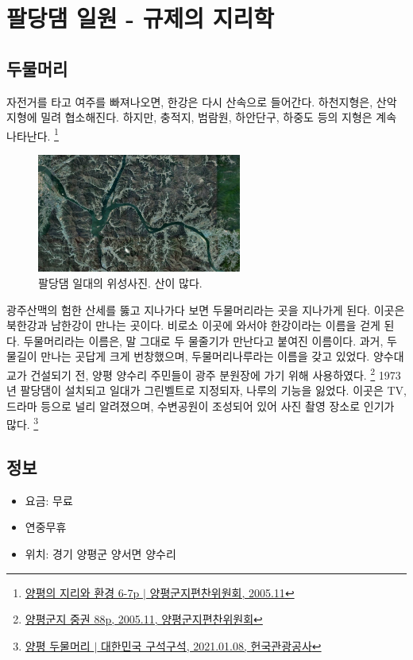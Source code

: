\section{팔당댐 일원 - 규제의 지리학}
\subsection{두물머리}
자전거를 타고 여주를 빠져나오면, 한강은 다시 산속으로 들어간다. 
하천지형은, 산악지형에 밀려 협소해진다. 하지만, 충적지, 범람원, 하안단구, 하중도 등의 지형은 계속 나타난다.
\footnote{\href{https://memory.library.kr/items/show/28910}{양평의 지리와 환경 6-7p $|$ 양평군지편찬위원회, 2005.11}}


\begin{figure}[ht]
    \centering
    \includegraphics[width=0.6\textwidth]{img/팔당호지도.jpg}
    \caption{팔당댐 일대의 위성사진. 산이 많다.\protect\footnotemark}
    \label{fig:my_label8}
\end{figure}


광주산맥의 험한 산세를 뚫고 지나가다 보면 두물머리라는 곳을 지나가게 된다. 이곳은 북한강과 남한강이 만나는 곳이다.
비로소 이곳에 와서야 한강이라는 이름을 걷게 된다.
두물머리라는 이름은, 말 그대로 두 물줄기가 만난다고 붙여진 이름이다.
과거, 두 물길이 만나는 곳답게 크게 번창했으며, 두물머리나루라는 이름을 갖고 있었다.
양수대교가 건설되기 전, 양평 양수리 주민들이 광주 분원장에 가기 위해 사용하였다.
\footnote{\href{https://memory.library.kr/files/original/d0e1ac861462002dbd83441d0c6e38e6.pdf}{양평군지 중권 88p, 2005.11, 양평군지편찬위원회}}
1973년 팔당댐이 설치되고 일대가 그린벨트로 지정되자,
나루의 기능을 잃었다.
이곳은 TV, 드라마 등으로 널리 알려졌으며,
수변공원이 조성되어 있어 사진 촬영 장소로 인기가 많다.
\footnote{\href{https://terms.naver.com/entry.naver?docId=1997444&cid=42856&categoryId=42856}{양평 두물머리 $|$ 대한민국 구석구석, 2021.01.08, 헌국관광공사}}

\subsection{정보}
\begin{itemize}
    \item 요금: 무료
    \item 연중무휴
    \item 위치: 경기 양평군 양서면 양수리
\end{itemize}


